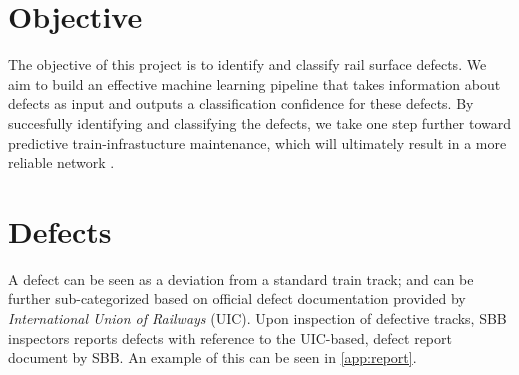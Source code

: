 \section{Objective}
The objective of this project is to identify and classify rail surface defects. We aim to build an effective machine learning pipeline that takes information about defects as input and outputs a classification confidence for these defects. By succesfully identifying and classifying the defects, we take one step further toward predictive train-infrastucture maintenance, which will ultimately result in a more reliable network \cite{unknown}.

\section{Defects}
\label{sec:defects}
A defect can be seen as a deviation from a standard train track; and can be further sub-categorized based on official defect documentation \cite{rail:online} provided by \textit{International Union of Railways} (UIC). Upon inspection of defective tracks, SBB inspectors reports defects with reference to the UIC-based, defect report document by SBB. An example of this can be seen in \ref{app:report}.

